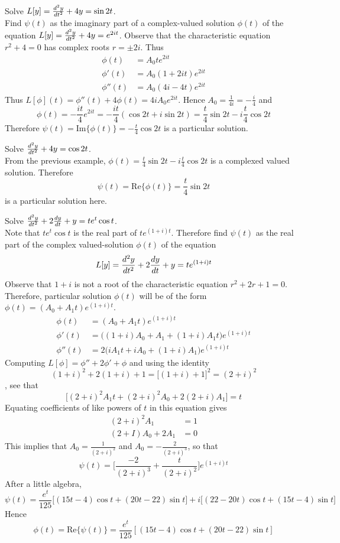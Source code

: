 \documentclass[12pt]{article}
\begin{document}
\begin{example} Solve $L[y] = \frac{d^2y}{dt^2} + 4y = \sin 2t$. \\ Find $\psi(t)$ as the imaginary part of a complex-valued solution $\phi(t)$ of the equation $L[y] = \frac{d^2y}{dt^2} + 4y = e^{2it}$. Observe that the characteristic equation $r^2 + 4 = 0$ has complex roots $r = \pm 2i$. Thus $$\begin{aligned} \phi(t) &= A_0te^{2it} \\ \phi'(t) &= A_0(1 + 2it)e^{2it} \\ \phi''(t) &= A_0(4i - 4t)e^{2it} \end{aligned} $$ 
Thus $L[\phi](t) = \phi''(t) + 4\phi(t) = 4iA_0e^{2it}$. Hence $A_0 = \frac{1}{4i} = -\frac{i}{4}$ and $$\phi(t) = -\frac{it}{4}e^{2it} = -\frac{it}{4}(\cos 2t + i\sin 2t) = \frac{t}{4}\sin 2t - i\frac{t}{4}\cos 2t$$ 
Therefore $\psi(t) = \text{Im}\{\phi(t)\} = -\frac{t}{4}\cos 2t$ is a particular solution. \end{example} 

\begin{example} Solve $\frac{d^2y}{dt^2} + 4y = \cos 2t$. \\ From the previous example, $\phi(t) = \frac{t}{4}\sin 2t - i\frac{t}{4}\cos 2t$ is a complexed valued solution. Therefore $$\psi(t) = \text{Re}\{\phi(t)\} = \frac{t}{4}\sin 2t$$ is a particular solution here. \end{example} 

\begin{example} Solve $\frac{d^2y}{dt^2} + 2\frac{dy}{dt} + y = te^t\cos t$. \\ Note that $te^t\cos t$ is the real part of $te^{(1 + i)t}$. Therefore find $\psi(t)$ as the real part of the complex valued-solution $\phi(t)$ of the equation $$L[y] = \frac{d^2y}{dt^2} + 2\frac{dy}{dt} + y = te^{(1 + i)t}$$ 
Observe that $1 + i$ is not a root of the characteristic equation $r^2 + 2r + 1 = 0$. Therefore, particular solution $\phi(t)$ will be of the form $\phi(t) = (A_0 + A_1t)e^{(1 + i)t}$.  $$\begin{aligned} \phi(t) &= (A_0 + A_1t)e^{(1 + i)t} \\ \phi'(t) &= \Big((1 + i)A_0 + A_1 + (1 + i)A_1t\Big)e^{(1 + i)t} \\ \phi''(t) &= 2\Big(iA_1t + iA_0 + (1 + i)A_1\Big)e^{(1 + i)t} \end{aligned} $$ Computing $L[\phi] = \phi''  + 2\phi' + \phi$ and using the identity $$(1 + i)^2 + 2(1 + i) + 1 = \Big[(1 + i) + 1\Big]^2 = (2 + i)^2$$, see that $$\Big[(2 + i)^2 A_1t + (2 + i)^2A_0 + 2(2 + i)A_1\Big] = t$$ Equating coefficients of like powers of $t$ in this equation gives $$\begin{aligned} (2 + i)^2A_1 &= 1 \\ (2 + I)A_0 + 2A_1 &= 0 \end{aligned} $$ 
This implies that $A_0 = \frac{1}{(2 + i)^2}$ and $A_0 = -\frac{2}{(2 + i)^3}$, so that $$\psi(t) = \Bigg[\frac{-2}{(2 + i)^3} + \frac{t}{(2 + i)^2}\Bigg]e^{(1 + i)t} $$ After a little algebra, $$\psi(t) = \frac{e^t}{125}\Big[(15t - 4)\cos t + (20t - 22)\sin t\Big] + i\Big[(22 - 20t)\cos t + (15t - 4)\sin t\Big] $$ Hence $$\phi(t) = \text{Re}\{\psi(t)\} = \frac{e^t}{125} [(15t - 4)\cos t + (20t - 22)\sin t] $$  \end{example}
\end{document}
